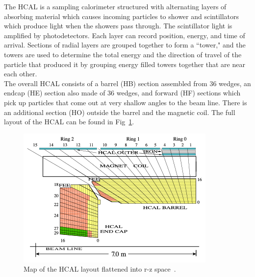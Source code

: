 	The HCAL is a sampling calorimeter structured with alternating layers of absorbing material  which causes incoming particles to shower and scintillators which produce light when the showers pass through. The scintillator light is amplified by photodetectors. Each layer can record position, energy, and time of arrival. Sections of radial layers are grouped together to form a ``tower," and the towers are used to determine the total energy and the direction of travel of the particle that produced it by grouping energy filled towers together that are near each other.\\
	
	The overall HCAL consists of a barrel (HB) section assembled from 36 wedges, an endcap (HE) section also made of 36 wedges, and forward (HF) sections which pick up particles that come out at very shallow angles to the beam line. There is an additional section (HO) outside the barrel and the magnetic coil. The full layout of the HCAL can be found in Fig~\ref{fig:hcal}.\\
	
						\begin{figure}[h]
\begin{center}
\includegraphics[width=0.8\linewidth]{Figs/HCAL_layout.png}
\caption{\label{fig:hcal}
Map of the HCAL layout flattened into r-z space~\cite{hcalperformance}.
}
\end{center}
\end{figure}

